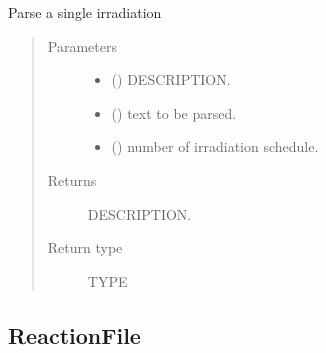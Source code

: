 \documentclass[letterpaper,10pt,english]{sphinxmanual}
\begin{document}
\begin{fulllineitems}
\begin{fulllineitems}
\label{\detokenize{api/inputgeneration:parsersD1S.Irradiation.from_text}}
\sphinxAtStartPar
Parse a single irradiation
\begin{quote}\begin{description}
\item[{Parameters}] \leavevmode\begin{itemize}
\item {} 
\sphinxAtStartPar
{} () \textendash{} DESCRIPTION.

\item {} 
\sphinxAtStartPar
{} () \textendash{} text to be parsed.

\item {} 
\sphinxAtStartPar
{} () \textendash{} number of irradiation schedule.

\end{itemize}

\item[{Returns}] \leavevmode
\sphinxAtStartPar
DESCRIPTION.

\item[{Return type}] \leavevmode
\sphinxAtStartPar
TYPE

\end{description}\end{quote}

\end{fulllineitems}


\end{fulllineitems}



\subsection{ReactionFile}
\label{\detokenize{api/inputgeneration:reactionfile}}\label{\detokenize{api/inputgeneration:reacfileob}}
\end{document}
